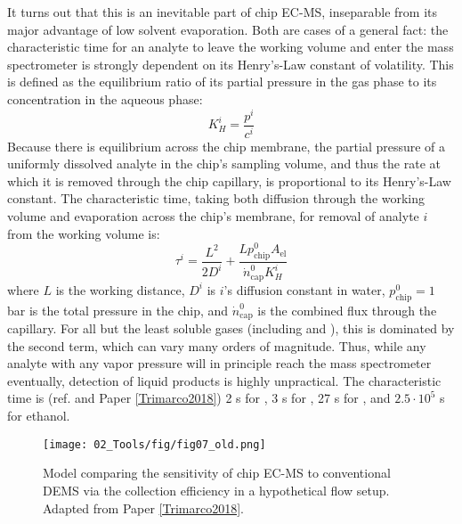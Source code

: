 It turns out that this is an inevitable part of chip EC-MS, inseparable from its major advantage of low solvent evaporation\cite{Scott2016_MSc}. Both are cases of a general fact: the characteristic time for an analyte to leave the working volume and enter the mass spectrometer is strongly dependent on its Henry's-Law constant of volatility. This is defined as the equilibrium ratio of its partial pressure in the gas phase to its concentration in the aqueous phase:
\begin{equation}
K_H^i = \frac{p^i}{c^i}
\end{equation}
Because there is equilibrium across the chip membrane, the partial pressure of a uniformly dissolved analyte in the chip's sampling volume, and thus the rate at which it is removed through the chip capillary, is proportional to its Henry's-Law constant. The characteristic time, taking both diffusion through the working volume and evaporation across the chip's membrane, for removal of analyte $i$ from the working volume is\cite{Scott2016_MSc}:
\begin{equation}
\tau^i = \frac{L^2}{2D^i} + \frac{L p^0_\text{chip}A_\text{el}}{\dot{n}^0_\text{cap} K^i_H}
\end{equation}
where $L$ is the working distance, $D^i$ is $i$'s diffusion constant in water, $p^0_\text{chip}=1$ bar is the total pressure in the chip, and $\dot{n}^0_\text{cap}$ is the combined flux through the capillary. For all but the least soluble gases (including  and ), this is dominated by the second term, which can vary many orders of magnitude. Thus, while any analyte with any vapor pressure will in principle reach the mass spectrometer eventually, detection of liquid products is highly unpractical. The characteristic time is (ref. \cite{Scott2016_MSc} and Paper \ref{Trimarco2018}) 2 s for , 3 s for , 27 s for , and $2.5\cdot10^{5}$ s for ethanol.

\begin{figure}[h!]
	\texttt{[image: 02\_Tools/fig/fig07\_old.png]}
	\caption{Model comparing the sensitivity of chip EC-MS to conventional DEMS via the collection efficiency in a hypothetical flow setup. Adapted from Paper \ref{Trimarco2018}.}
	\label{fig:sensitivity}
\end{figure}

